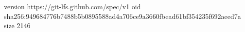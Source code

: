 version https://git-lfs.github.com/spec/v1
oid sha256:949684776b7488b5b0895588ad4a706ce9a3660fbead61bf354235f692aeed7a
size 2146
